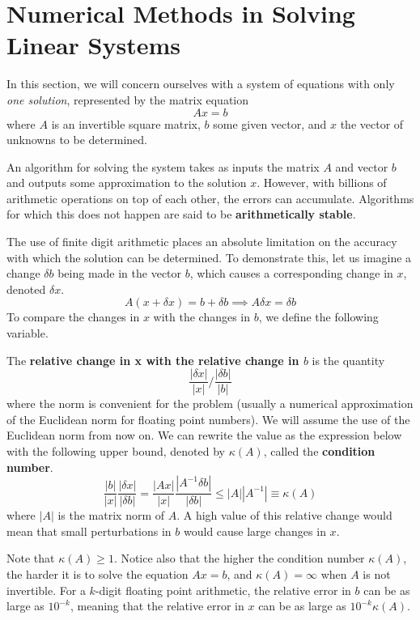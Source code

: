 \section{Numerical Methods in Solving Linear Systems}

  In this section, we will concern ourselves with a system of equations with only \textit{one solution}, represented by the matrix equation
  \[A x = b\]
  where $A$ is an invertible square matrix, $b$ some given vector, and $x$ the vector of unknowns to be determined. 

  An algorithm for solving the system takes as inputs the matrix $A$ and vector $b$ and outputs some approximation to the solution $x$. However, with billions of arithmetic operations on top of each other, the errors can accumulate. Algorithms for which this does not happen are said to be \textbf{arithmetically stable}. 

  The use of finite digit arithmetic places an absolute limitation on the accuracy with which the solution can be determined. To demonstrate this, let us imagine a change $\delta b$ being made in the vector $b$, which causes a corresponding change in $x$, denoted $\delta x$. 
  \[A(x + \delta x) = b + \delta b \implies A \delta x = \delta b\]
  To compare the changes in $x$ with the changes in $b$, we define the following variable. 
  \begin{definition}
  The \textbf{relative change in x with the relative change in $b$} is the quantity
  \[\frac{|\delta x|}{|x|} \bigg/ \frac{|\delta b|}{|b|}\]
  where the norm is convenient for the problem (usually a numerical approximation of the Euclidean norm for floating point numbers). We will assume the use of the Euclidean norm from now on. We can rewrite the value as the expression below with the following upper bound, denoted by $\kappa (A)$, called the \textbf{condition number}. 
  \[\frac{|b|}{|x|} \frac{|\delta x|}{|\delta b|} = \frac{|Ax|}{|x|} \frac{|A^{-1} \delta b|}{|\delta b|} \leq |A||A^{-1}| \equiv \kappa (A)\]
  where $|A|$ is the matrix norm of $A$. 
  A high value of this relative change would mean that small perturbations in $b$ would cause large changes in $x$.
  \end{definition}

  Note that $\kappa(A) \geq 1$. Notice also that the higher the condition number $\kappa (A)$, the harder it is to solve the equation $A x = b$, and $\kappa(A) = \infty$ when $A$ is not invertible. For a $k$-digit floating point arithmetic, the relative error in $b$ can be as large as $10^{-k}$, meaning that the relative error in $x$ can be as large as $10^{-k} \kappa (A)$. 

